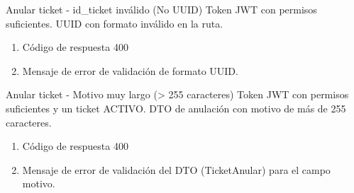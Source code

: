 {Anular ticket - id\_ticket inválido (No UUID)}
{Token JWT con permisos suficientes.}
{UUID con formato inválido en la ruta.}
{\begin{enumerate} [leftmargin=*, nosep]
    \item Código de respuesta 400
    \item Mensaje de error de validación de formato UUID.
\end{enumerate}}

{Anular ticket - Motivo muy largo (> 255 caracteres)}
{Token JWT con permisos suficientes y un ticket ACTIVO.}
{DTO de anulación con motivo de más de 255 caracteres.}
{\begin{enumerate} [leftmargin=*, nosep]
    \item Código de respuesta 400
    \item Mensaje de error de validación del DTO (TicketAnular) para el campo motivo.
\end{enumerate}}

